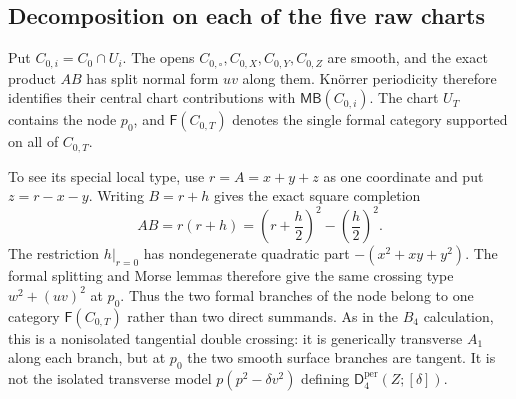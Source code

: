 \documentclass[11pt]{amsart}
\theoremstyle{definition}
\theoremstyle{remark}
\newcommand{\MBcat}[1]{\mathsf{MB}(#1)}
\newcommand{\Dper}[3]{\mathsf{D}^{\mathrm{per}}_{#2}(#1;[#3])}
\newcommand{\FormalCat}[1]{\mathsf{F}(#1)}
\begin{document}
\subsection{Decomposition on each of the five raw charts}

Put $C_{0,i}=C_0\cap U_i$.  The opens
$C_{0,\circ},C_{0,X},C_{0,Y},C_{0,Z}$ are smooth, and the exact product
$AB$ has split normal form $uv$ along them.  Kn\"orrer periodicity therefore
identifies their central chart contributions with
$\MBcat{C_{0,i}}$.  The chart $U_T$ contains the node $p_0$, and
$\FormalCat{C_{0,T}}$ denotes the single formal category supported on all of
$C_{0,T}$.

To see its special local type, use $r=A=x+y+z$ as one coordinate and put
$z=r-x-y$.  Writing $B=r+h$ gives the exact square completion
\[
AB=r(r+h)=\left(r+\frac h2\right)^2-\left(\frac h2\right)^2.
\]
The restriction $h|_{r=0}$ has nondegenerate quadratic part
$-(x^2+xy+y^2)$.  The formal splitting and Morse lemmas therefore give the
same crossing type $w^2+(uv)^2$ at $p_0$.  Thus the two formal branches of the
node belong to one category $\FormalCat{C_{0,T}}$ rather than two direct
summands.  As in the $B_4$ calculation, this is a nonisolated tangential
double crossing: it is generically transverse $A_1$ along each branch, but at
$p_0$ the two smooth surface branches are tangent.  It is not the isolated
transverse model $p(p^2-\delta v^2)$ defining $\Dper{Z}{4}{\delta}$.
\end{document}
